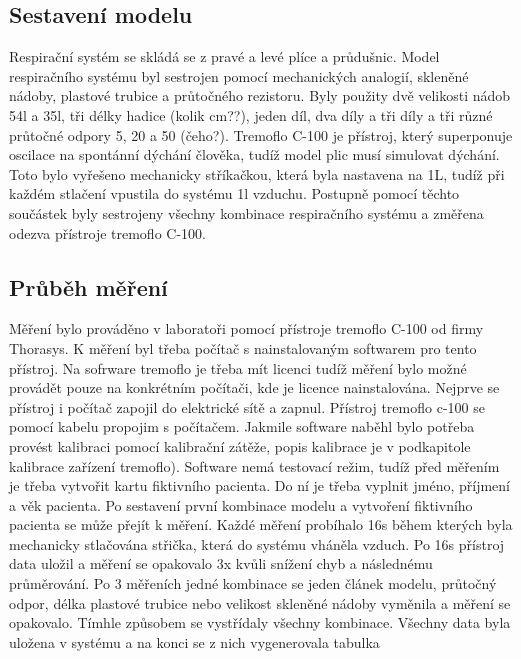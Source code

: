 \subsection{Sestavení modelu}
Respirační systém se skládá se z pravé a levé plíce a průdušnic. Model respiračního systému  byl sestrojen pomocí mechanických analogií, skleněné nádoby, plastové trubice a průtočného rezistoru. Byly použity dvě velikosti nádob 54l a 35l, tři délky hadice (kolik cm??), jeden díl, dva díly a tři díly a tři různé průtočné odpory 5, 20 a 50 (čeho?). 
Tremoflo C-100 je přístroj, který superponuje oscilace na spontánní dýchání člověka, tudíž model plic musí simulovat dýchání. Toto bylo vyřešeno mechanicky stříkačkou, která byla nastavena na 1L, tudíž při každém stlačení vpustila do systému 1l vzduchu. 
Postupně pomocí těchto součástek byly sestrojeny všechny kombinace respiračního systému a změřena odezva přístroje tremoflo C-100.

\subsection{Průběh měření}
Měření bylo prováděno v laboratoři pomocí přístroje tremoflo C-100 od firmy Thorasys. K měření byl třeba počítač s nainstalovaným softwarem pro tento přístroj. Na sofrware tremoflo je třeba mít licenci tudíž měření bylo možné provádět pouze na konkrétním počítači, kde je licence nainstalována.  Nejprve se přístroj i počítač zapojil do elektrické sítě a zapnul. Přístroj tremoflo c-100 se pomocí kabelu propojim s počítačem. Jakmile software naběhl bylo potřeba provést kalibraci pomocí kalibrační zátěže, popis kalibrace je v podkapitole kalibrace zařízení tremoflo). Software nemá testovací režim, tudíž před měřením je třeba vytvořit kartu fiktivního pacienta. Do ní je třeba vyplnit  jméno, příjmení a věk pacienta. Po sestavení první kombinace modelu a vytvoření fiktivního pacienta se může přejít k měření. Každé měření probíhalo 16s během kterých byla mechanicky stlačována střička, která do systému vháněla vzduch. Po 16s přístroj data uložil a měření se opakovalo 3x kvůli snížení chyb a následnému průměrování. Po 3 měřeních jedné kombinace se jeden článek modelu, průtočný odpor, délka plastové trubice nebo velikost skleněné nádoby vyměnila a měření se opakovalo. Tímhle způsobem se vystřídaly všechny kombinace. Všechny data byla uložena v systému a na konci se z nich vygenerovala tabulka

